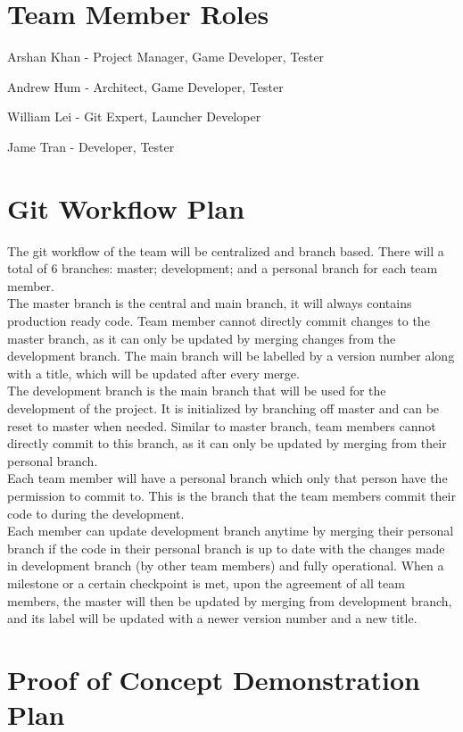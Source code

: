 \documentclass{article}
\begin{document}
\section{Team Member Roles}

\item Arshan Khan - Project Manager, Game Developer, Tester
\item Andrew Hum - Architect, Game Developer, Tester
\item William Lei - Git Expert, Launcher Developer
\item Jame Tran - Developer, Tester

\section{Git Workflow Plan}

The git workflow of the team will be centralized and branch based. There will a total of 6 branches: master; development; and a personal branch for each team member.\\
The master branch is the central and main branch, it will always contains production ready code. Team member cannot directly commit changes to the master branch, as it can only be updated by merging changes from the development branch. The main branch will be labelled by a version number along with a title, which will be updated after every merge.\\
The development branch is the main branch that will be used for the development of the project. It is initialized by branching off master and can be reset to master when needed. Similar to master branch, team members cannot directly commit to this branch, as it can only be updated by merging from their personal branch.\\
Each team member will have a personal branch which only that person have the permission to commit to. This is the branch that the team members commit their code to during the development.\\
Each member can update development branch anytime by merging their personal branch if the code in their personal branch is up to date with the changes made in development branch (by other team members) and fully operational. When a milestone or a certain checkpoint is met, upon the agreement of all team members, the master will then be updated by merging from development branch, and its label will be updated with a newer version number and a new title.

\section{Proof of Concept Demonstration Plan}
\end{document}
